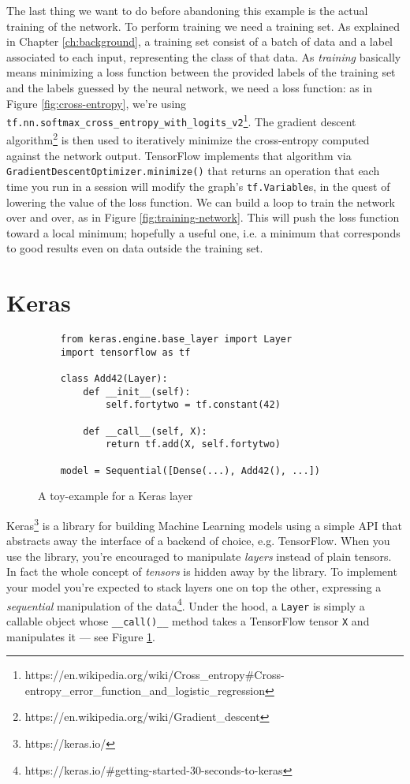 The last thing we want to do before abandoning this example is the
actual training of the network. To perform training we need a training
set. As explained in Chapter \ref{ch:background}, a training set
consist of a batch of data and a label associated to each input,
representing the class of that data. As \emph{training} basically means
minimizing a loss function between the provided labels of the training
set and the labels guessed by the neural network, we need a loss
function: as in Figure \ref{fig:cross-entropy}, we're using
\texttt{tf.nn.softmax\_cross\_entropy\_with\_logits\_v2}\footnote{https://en.wikipedia.org/wiki/Cross\_entropy\#Cross-entropy\_error\_function\_and\_logistic\_regression}.
The gradient descent
algorithm\footnote{https://en.wikipedia.org/wiki/Gradient\_descent} is
then used to iteratively minimize the cross-entropy computed against
the network output. TensorFlow implements that algorithm via
\texttt{GradientDescentOptimizer.minimize()} that returns an operation
that each time you run in a session will modify the graph's
\texttt{tf.Variable}s, in the quest of lowering the value of the loss
function. We can build a loop to train the network over and over, as in
Figure \ref{fig:training-network}. This will push the loss function
toward a local minimum; hopefully a useful one, i.e. a minimum that
corresponds to good results even on data outside the training set.

\section{Keras}
\label{sec:keras}

\begin{figure}
  \begin{verbatim}
    from keras.engine.base_layer import Layer
    import tensorflow as tf

    class Add42(Layer):
        def __init__(self):
            self.fortytwo = tf.constant(42)

        def __call__(self, X):
            return tf.add(X, self.fortytwo)

    model = Sequential([Dense(...), Add42(), ...])
  \end{verbatim}
  \caption{A toy-example for a Keras layer}
  \label{fig:toy-layer}
\end{figure}

Keras\footnote{https://keras.io/} is a library for building Machine
Learning models using a simple API that abstracts away the interface of
a backend of choice, e.g. TensorFlow. When you use the library, you're
encouraged to manipulate \emph{layers} instead of plain tensors. In
fact the whole concept of \emph{tensors} is hidden away by the library.
To implement your model you're expected to stack layers one on top the
other, expressing a \emph{sequential} manipulation of the
data\footnote{https://keras.io/\#getting-started-30-seconds-to-keras}.
Under the hood, a \texttt{Layer} is simply a callable object whose
\texttt{\_\_call()\_\_} method takes a TensorFlow tensor \texttt{X} and
manipulates it --- see Figure \ref{fig:toy-layer}.

